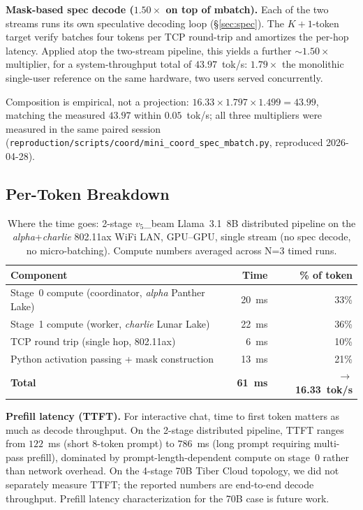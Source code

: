 \documentclass[11pt]{article}
\newcommand{\brk}{\discretionary{}{}{}}
\begin{document}
\textbf{Mask-based spec decode ($1.50\times$ on top of mbatch).} Each of the two streams runs its own speculative decoding loop (\S\ref{sec:spec}). The $K\!+\!1$-token target verify batches four tokens per TCP round-trip and amortizes the per-hop latency. Applied atop the two-stream pipeline, this yields a further $\sim 1.50\times$ multiplier, for a system-throughput total of $43.97$~tok/s: $1.79\times$ the monolithic single-user reference on the same hardware, two users served concurrently.

Composition is empirical, not a projection: $16.33 \times 1.797 \times 1.499 = 43.99$, matching the measured $43.97$ within $0.05$~tok/s; all three multipliers were measured in the same paired session (\texttt{reproduction/\brk scripts/\brk coord/\brk mini\_\brk coord\_\brk spec\_\brk mbatch.py}, reproduced 2026-04-28).

\subsection{Per-Token Breakdown}

\begin{table}[ht]
\centering
\caption{Where the time goes: 2-stage $v_5$\_beam Llama~3.1~8B distributed pipeline on the \emph{alpha}+\emph{charlie} 802.11ax WiFi LAN, GPU--GPU, single stream (no spec decode, no micro-batching). Compute numbers averaged across N=3 timed runs.}
\label{tab:breakdown}
\begin{tabular}{@{}lrr@{}}
\toprule
Component & Time & \% of token \\
\midrule
Stage~0 compute (coordinator, \emph{alpha} Panther Lake) & 20~ms & 33\% \\
Stage~1 compute (worker, \emph{charlie} Lunar Lake) & 22~ms & 36\% \\
TCP round trip (single hop, 802.11ax) & 6~ms & 10\% \\
Python activation passing + mask construction & 13~ms & 21\% \\
\midrule
\textbf{Total} & \textbf{61~ms} & $\rightarrow$ \textbf{16.33~tok/s} \\
\bottomrule
\end{tabular}
\end{table}

\textbf{Prefill latency (TTFT).} For interactive chat, time to first token matters as much as decode throughput. On the 2-stage distributed pipeline, TTFT ranges from $122$~ms (short 8-token prompt) to $786$~ms (long prompt requiring multi-pass prefill), dominated by prompt-length-dependent compute on stage~0 rather than network overhead. On the 4-stage 70B Tiber Cloud topology, we did not separately measure TTFT; the reported numbers are end-to-end decode throughput. Prefill latency characterization for the 70B case is future work.
\end{document}
